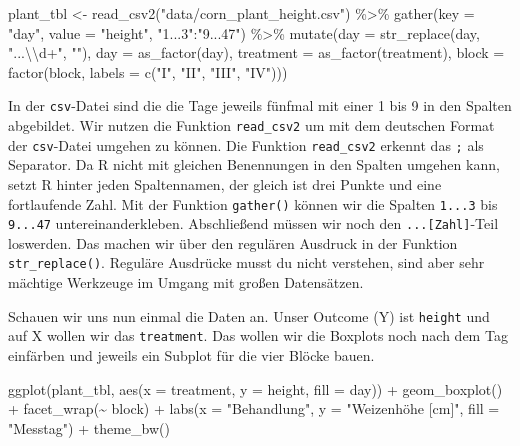 \documentclass[
  letterpaper,
]{scrbook}
\newenvironment{Shaded}{\begin{snugshade}}{\end{snugshade}}
\newcommand{\AttributeTok}[1]{\textcolor[rgb]{0.40,0.45,0.13}{#1}}
\newcommand{\FunctionTok}[1]{\textcolor[rgb]{0.28,0.35,0.67}{#1}}
\newcommand{\NormalTok}[1]{\textcolor[rgb]{0.00,0.23,0.31}{#1}}
\newcommand{\OtherTok}[1]{\textcolor[rgb]{0.00,0.23,0.31}{#1}}
\newcommand{\SpecialCharTok}[1]{\textcolor[rgb]{0.37,0.37,0.37}{#1}}
\newcommand{\StringTok}[1]{\textcolor[rgb]{0.13,0.47,0.30}{#1}}
\begin{document}
\begin{Shaded}
\begin{Highlighting}[]
\NormalTok{plant\_tbl }\OtherTok{\textless{}{-}} \FunctionTok{read\_csv2}\NormalTok{(}\StringTok{"data/corn\_plant\_height.csv"}\NormalTok{) }\SpecialCharTok{\%\textgreater{}\%} 
  \FunctionTok{gather}\NormalTok{(}\AttributeTok{key =} \StringTok{"day"}\NormalTok{, }\AttributeTok{value =} \StringTok{"height"}\NormalTok{, }\StringTok{"1...3"}\SpecialCharTok{:}\StringTok{"9...47"}\NormalTok{) }\SpecialCharTok{\%\textgreater{}\%} 
  \FunctionTok{mutate}\NormalTok{(}\AttributeTok{day =} \FunctionTok{str\_replace}\NormalTok{(day, }\StringTok{"...}\SpecialCharTok{\textbackslash{}\textbackslash{}}\StringTok{d+"}\NormalTok{, }\StringTok{""}\NormalTok{),}
         \AttributeTok{day =} \FunctionTok{as\_factor}\NormalTok{(day),}
         \AttributeTok{treatment =} \FunctionTok{as\_factor}\NormalTok{(treatment),}
         \AttributeTok{block =} \FunctionTok{factor}\NormalTok{(block, }\AttributeTok{labels =} \FunctionTok{c}\NormalTok{(}\StringTok{"I"}\NormalTok{, }\StringTok{"II"}\NormalTok{, }\StringTok{"III"}\NormalTok{, }\StringTok{"IV"}\NormalTok{)))}
\end{Highlighting}
\end{Shaded}

In der \texttt{csv}-Datei sind die die Tage jeweils fünfmal mit einer 1
bis 9 in den Spalten abgebildet. Wir nutzen die Funktion
\texttt{read\_csv2} um mit dem deutschen Format der \texttt{csv}-Datei
umgehen zu können. Die Funktion \texttt{read\_csv2} erkennt das
\texttt{;} als Separator. Da R nicht mit gleichen Benennungen in den
Spalten umgehen kann, setzt R hinter jeden Spaltennamen, der gleich ist
drei Punkte und eine fortlaufende Zahl. Mit der Funktion
\texttt{gather()} können wir die Spalten \texttt{1...3} bis
\texttt{9...47} untereinanderkleben. Abschließend müssen wir noch den
\texttt{...{[}Zahl{]}}-Teil loswerden. Das machen wir über den regulären
Ausdruck in der Funktion \texttt{str\_replace()}. Reguläre Ausdrücke
musst du nicht verstehen, sind aber sehr mächtige Werkzeuge im Umgang
mit großen Datensätzen.

Schauen wir uns nun einmal die Daten an. Unser Outcome (Y) ist
\texttt{height} und auf X wollen wir das \texttt{treatment}. Das wollen
wir die Boxplots noch nach dem Tag einfärben und jeweils ein Subplot für
die vier Blöcke bauen.

\begin{Shaded}
\begin{Highlighting}[]
\FunctionTok{ggplot}\NormalTok{(plant\_tbl, }\FunctionTok{aes}\NormalTok{(}\AttributeTok{x =}\NormalTok{ treatment, }\AttributeTok{y =}\NormalTok{ height, }\AttributeTok{fill =}\NormalTok{ day)) }\SpecialCharTok{+}
  \FunctionTok{geom\_boxplot}\NormalTok{() }\SpecialCharTok{+}
  \FunctionTok{facet\_wrap}\NormalTok{(}\SpecialCharTok{\textasciitilde{}}\NormalTok{ block) }\SpecialCharTok{+}
  \FunctionTok{labs}\NormalTok{(}\AttributeTok{x =} \StringTok{"Behandlung"}\NormalTok{, }\AttributeTok{y =} \StringTok{"Weizenhöhe [cm]"}\NormalTok{, }\AttributeTok{fill =} \StringTok{"Messtag"}\NormalTok{) }\SpecialCharTok{+}
  \FunctionTok{theme\_bw}\NormalTok{()}
\end{Highlighting}
\end{Shaded}
\end{document}
